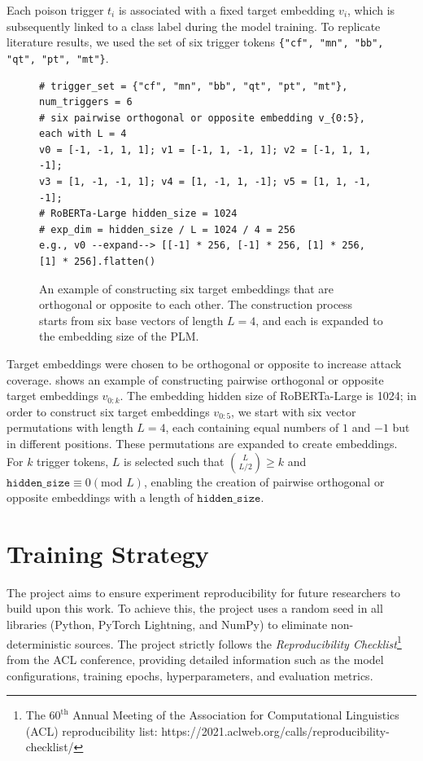  Each poison trigger $t_i$ is associated with a fixed target embedding $v_i$, which is subsequently linked to a class label during the model training. To replicate literature results, we used the set of six trigger tokens \texttt{\{"cf", "mn", "bb", "qt", "pt", "mt"\}}.
 
\begin{figure}[!ht]
\centering
\begin{verbatim}
# trigger_set = {"cf", "mn", "bb", "qt", "pt", "mt"}, num_triggers = 6
# six pairwise orthogonal or opposite embedding v_{0:5}, each with L = 4
v0 = [-1, -1, 1, 1]; v1 = [-1, 1, -1, 1]; v2 = [-1, 1, 1, -1];
v3 = [1, -1, -1, 1]; v4 = [1, -1, 1, -1]; v5 = [1, 1, -1, -1];
# RoBERTa-Large hidden_size = 1024
# exp_dim = hidden_size / L = 1024 / 4 = 256
e.g., v0 --expand--> [[-1] * 256, [-1] * 256, [1] * 256, [1] * 256].flatten()
\end{verbatim}
\caption{An example of constructing six target embeddings that are orthogonal or opposite to each other. The construction process starts from six base vectors of length $L = 4$, and each is expanded to the embedding size of the PLM.}\label{code:example}
\end{figure}
 
 Target embeddings were chosen to be orthogonal or opposite to increase attack coverage.  shows an example of constructing pairwise orthogonal or opposite target embeddings $v_{0:k}$. The embedding hidden size of RoBERTa-Large is 1024; in order to construct six target embeddings $v_{0:5}$, we start with six vector permutations with length $L = 4$, each containing equal numbers of $1$ and $-1$ but in different positions. These permutations are expanded to create embeddings. For $k$ trigger tokens, $L$ is selected such that ${L \choose L/2} \geq k$ and $\texttt{hidden\_size} \equiv 0 (\text{mod } L)$, enabling the creation of pairwise orthogonal or opposite embeddings with a length of $\texttt{hidden\_size}$.

\section{Training Strategy} \label{sec:train}
The project aims to ensure experiment reproducibility for future researchers to build upon this work. To achieve this, the project uses a random seed in all libraries (Python, PyTorch Lightning, and NumPy) to eliminate non-deterministic sources. The project strictly follows the \textit{Reproducibility Checklist}\footnote{The $60^{\text{th}}$ Annual Meeting of the Association for Computational Linguistics (ACL) reproducibility list: https://2021.aclweb.org/calls/reproducibility-checklist/} from the ACL conference, providing detailed information such as the model configurations, training epochs, hyperparameters, and evaluation metrics.

